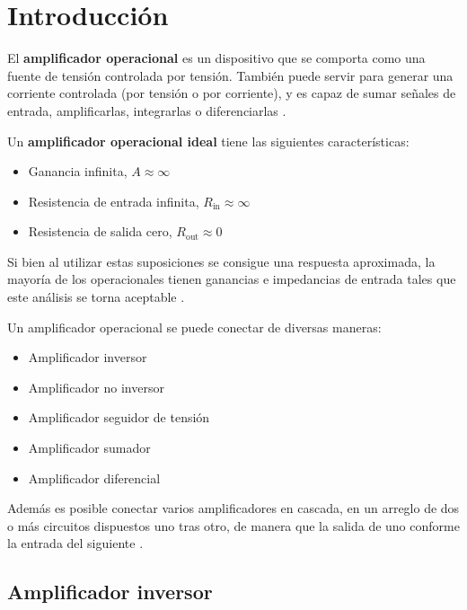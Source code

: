 \section{Introducción}
\label{sec:intro}

El \textbf{amplificador operacional} es un dispositivo que se comporta como una fuente de tensión controlada por tensión. También puede servir para generar una corriente controlada (por tensión o por corriente), y es capaz de sumar señales de entrada, amplificarlas, integrarlas o diferenciarlas \cite[pág. 176]{FDCE}. 


Un \textbf{amplificador operacional ideal} tiene las siguientes características:

\begin{itemize}
    \item Ganancia infinita, $A\approx\infty$
    \item Resistencia de entrada infinita, $R_{\text{in}} \approx \infty$
    \item Resistencia de salida cero, $R_{\text{out}} \approx 0$
\end{itemize}

Si bien al utilizar estas suposiciones se consigue una respuesta aproximada, la mayoría de los operacionales tienen ganancias e impedancias de entrada tales que este análisis se torna aceptable \cite[pág. 180]{FDCE}.

Un amplificador operacional se puede conectar de diversas maneras:

\begin{itemize}
    \item Amplificador inversor
    \item Amplificador no inversor
    \item Amplificador seguidor de tensión
    \item Amplificador sumador
    \item Amplificador diferencial
\end{itemize}

Además es posible conectar varios amplificadores en cascada, en un arreglo de dos o más circuitos dispuestos uno tras otro, de manera que la salida de uno conforme la entrada del siguiente \cite[pág. 191]{FDCE}.

\subsection{Amplificador inversor}
\label{sec:intro:opamp-inversor}

